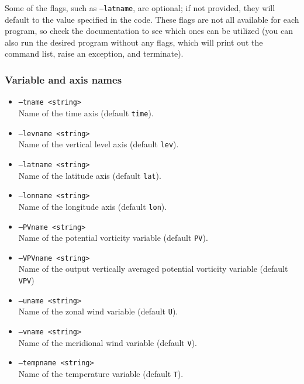 \documentclass{article}
\begin{document}
Some of the flags, such as \texttt{--latname}, are optional; if not provided, they will default to the value specified in the code. These flags are not all available for each program, so check the documentation to see which ones can be utilized (you can also run the desired program without any flags, which will print out the command list, raise an exception, and terminate).

\subsubsection{Variable and axis names}

\begin{itemize}
\item[] \texttt{--tname <string>}\\Name of the time axis (default \texttt{time}).
\item[] \texttt{--levname <string>}\\Name of the vertical level axis (default \texttt{lev}).
\item[]\texttt{--latname <string>}\\Name of the latitude axis (default \texttt{lat}).
\item[]\texttt{--lonname <string>}\\Name of the longitude axis (default \texttt{lon}).
\item[] \texttt{--PVname <string>}\\Name of the potential vorticity variable (default \texttt{PV}).
\item[]\texttt{--VPVname <string>}\\Name of the output vertically averaged potential vorticity variable (default \texttt{VPV})
\item[] \texttt{--uname <string>}\\Name of the zonal wind variable (default \texttt{U}).
\item[] \texttt{--vname <string>}\\Name of the meridional wind variable (default \texttt{V}).
\item[] \texttt{--tempname <string>}\\Name of the temperature variable (default \texttt{T}).
\end{itemize}
\end{document}
